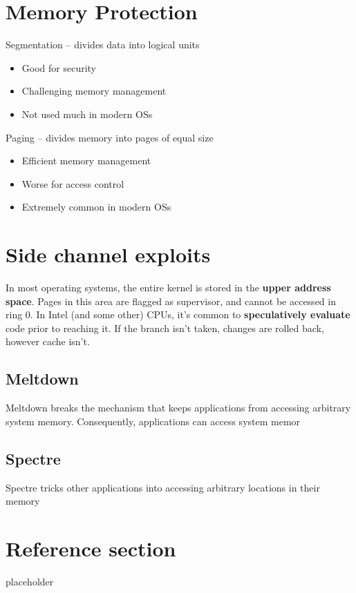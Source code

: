 \documentclass{article}
\begin{document}
\section{Memory Protection}
\begin{flushleft}
Segmentation – divides data into logical units
\begin{itemize}
  \item Good for security 
  \item Challenging memory management 
  \item Not used much in modern OSs
\end{itemize}
Paging – divides memory into pages of equal size
\begin{itemize}
  \item Efficient memory management 
  \item Worse for access control 
  \item Extremely common in modern OSs
\end{itemize}
\end{flushleft}

\section{Side channel exploits}
\begin{flushleft}
In most operating systems, the entire kernel is stored in the \textbf{upper address space}. Pages in this area are flagged as supervisor, and cannot be accessed in ring 0. In Intel (and some other) CPUs, it’s common to \textbf{speculatively evaluate} code prior to reaching it. If the branch isn't taken, changes are rolled back, however cache isn't.
\end{flushleft}

\subsection{Meltdown}
\begin{flushleft}
Meltdown breaks the mechanism that keeps applications from accessing arbitrary system memory. Consequently, applications can access system memor
\end{flushleft}

\subsection{Spectre}
\begin{flushleft}  
Spectre tricks other applications into accessing arbitrary locations in their memory
\end{flushleft}

\pagebreak
\section*{Reference section} \label{sec:reference}
\begin{description}
	\item[placeholder] \hfill \\
\end{description}
\end{document}
